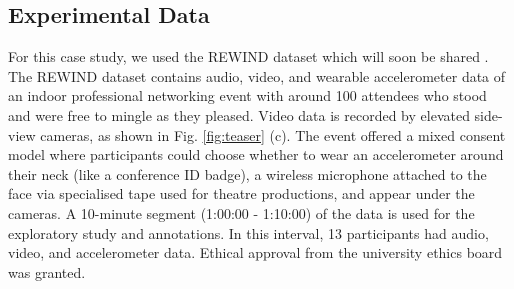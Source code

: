 \documentclass[manuscript,screen,review]{acmart}
\begin{document}



\subsection{Experimental Data}
For this case study, we used the REWIND dataset \cite{laughterquiros2023} which will soon be shared \cite{rewinddata}. The REWIND dataset contains audio, video, and wearable accelerometer data of an indoor professional networking event with around 100 attendees who stood and were free to mingle as they pleased. Video data is recorded by elevated side-view cameras, as shown in Fig. \ref{fig:teaser} (c). The event offered a mixed consent model where participants could choose whether to wear an accelerometer around their neck (like a conference ID badge), a wireless microphone attached to the face via specialised tape used for theatre productions, and appear under the cameras. A 10-minute segment (1:00:00 - 1:10:00) of the data is used for the exploratory study and annotations. In this interval, 13 participants had audio, video, and accelerometer data. Ethical approval from the university ethics board was granted.
\end{document}
